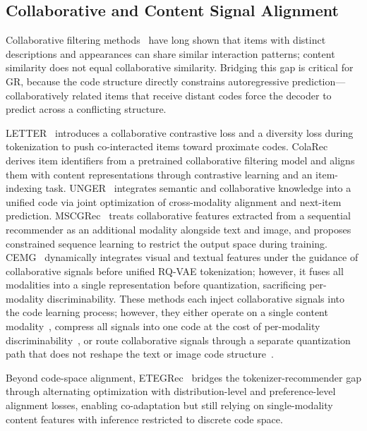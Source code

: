 \documentclass[sigconf, anonymous, review]{acmart}
\begin{document}
\subsection{Collaborative and Content Signal Alignment}

Collaborative filtering methods~\cite{rendle2009bpr,koren2009matrix,he2017neural} have long shown that items with distinct descriptions and appearances can share similar interaction patterns; content similarity does not equal collaborative similarity.
%
Bridging this gap is critical for GR, because the code structure directly constrains autoregressive prediction---collaboratively related items that receive distant codes force the decoder to predict across a conflicting structure.

LETTER~\cite{letter} introduces a collaborative contrastive loss and a diversity loss during tokenization to push co-interacted items toward proximate codes.
%
ColaRec~\cite{colarec} derives item identifiers from a pretrained collaborative filtering model and aligns them with content representations through contrastive learning and an item-indexing task.
%
UNGER~\cite{unger} integrates semantic and collaborative knowledge into a unified code via joint optimization of cross-modality alignment and next-item prediction.
%
MSCGRec~\cite{mscgrec} treats collaborative features extracted from a sequential recommender as an additional modality alongside text and image, and proposes constrained sequence learning to restrict the output space during training.
%
CEMG~\cite{cemg} dynamically integrates visual and textual features under the guidance of collaborative signals before unified RQ-VAE tokenization; however, it fuses all modalities into a single representation before quantization, sacrificing per-modality discriminability.
%
These methods each inject collaborative signals into the code learning process; however, they either operate on a single content modality~\cite{letter,colarec}, compress all signals into one code at the cost of per-modality discriminability~\cite{unger,cemg}, or route collaborative signals through a separate quantization path that does not reshape the text or image code structure~\cite{mscgrec}.

Beyond code-space alignment, ETEGRec~\cite{etegrec} bridges the tokenizer-recommender gap through alternating optimization with distribution-level and preference-level alignment losses, enabling co-adaptation but still relying on single-modality content features with inference restricted to discrete code space.
\end{document}
